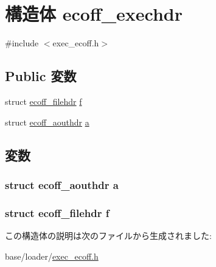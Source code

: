 \hypertarget{structecoff__exechdr}{
\section{構造体 ecoff\_\-exechdr}
\label{structecoff__exechdr}
}


{\ttfamily \#include $<$exec\_\-ecoff.h$>$}\subsection*{Public 変数}
\begin{DoxyCompactItemize}
\item 
struct \hyperlink{structecoff__filehdr}{ecoff\_\-filehdr} \hyperlink{structecoff__exechdr_a89258930dcff8362152616b8fe4f38cd}{f}
\item 
struct \hyperlink{structecoff__aouthdr}{ecoff\_\-aouthdr} \hyperlink{structecoff__exechdr_a5b4ab1f9f52883723be16443490bd697}{a}
\end{DoxyCompactItemize}


\subsection{変数}
\hypertarget{structecoff__exechdr_a5b4ab1f9f52883723be16443490bd697}{
\subsubsection[{a}]{\setlength{\rightskip}{0pt plus 5cm}struct {\bf ecoff\_\-aouthdr} {\bf a}}}
\label{structecoff__exechdr_a5b4ab1f9f52883723be16443490bd697}
\hypertarget{structecoff__exechdr_a89258930dcff8362152616b8fe4f38cd}{
\subsubsection[{f}]{\setlength{\rightskip}{0pt plus 5cm}struct {\bf ecoff\_\-filehdr} {\bf f}}}
\label{structecoff__exechdr_a89258930dcff8362152616b8fe4f38cd}


この構造体の説明は次のファイルから生成されました:\begin{DoxyCompactItemize}
\item 
base/loader/\hyperlink{exec__ecoff_8h}{exec\_\-ecoff.h}\end{DoxyCompactItemize}
